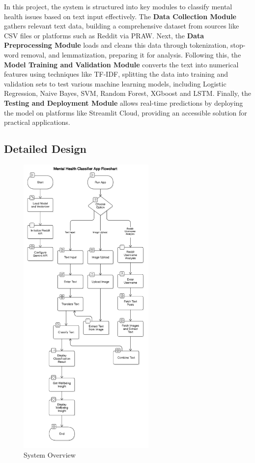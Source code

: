\noindent
In this project, the system is structured into key modules to classify mental health issues based on text input effectively. The \textbf{Data Collection Module} gathers relevant text data, building a comprehensive dataset from sources like CSV files or platforms such as Reddit via PRAW. Next, the \textbf{Data Preprocessing Module} loads and cleans this data through tokenization, stop-word removal, and lemmatization, preparing it for analysis. Following this, the \textbf{Model Training and Validation Module} converts the text into numerical features using techniques like TF-IDF, splitting the data into training and validation sets to test various machine learning models, including Logistic Regression, Naive Bayes, SVM, Random Forest, XGboost and LSTM. Finally, the \textbf{Testing and Deployment Module} allows real-time predictions by deploying the model on platforms like Streamlit Cloud, providing an accessible solution for practical applications.

\subsection{Detailed Design}
\begin{figure}[h!]  
    \centering
    \includegraphics[width=0.6\textwidth]{Images/System Overview.png}  
    \caption{System Overview}
    \label{System Overview}  %
\end{figure}

